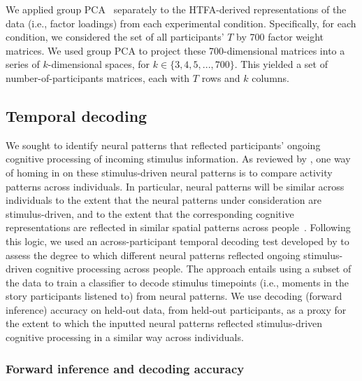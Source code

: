 \documentclass[english, 11pt]{article}
\begin{document}
We applied group PCA~\citep{SmitEtal14} separately to the HTFA-derived
representations of the data (i.e., factor loadings) from each experimental
condition. Specifically, for each condition, we considered the set of all
participants' $T$ by 700 factor weight matrices. We used group PCA to project
these 700-dimensional matrices into a series of $k$-dimensional spaces, for $k
\in \{3, 4, 5, ..., 700\}$. This yielded a set of number-of-participants
matrices, each with $T$ rows and $k$ columns.

\subsection*{Temporal decoding}

We sought to identify neural patterns that reflected participants' ongoing
cognitive processing of incoming stimulus information. As reviewed by
\cite{SimoEtal16}, one way of homing in on these stimulus-driven neural
patterns is to compare activity patterns across individuals. In particular,
neural patterns will be similar across individuals to the extent that the
neural patterns under consideration are stimulus-driven, and to the extent that
the corresponding cognitive representations are reflected in similar spatial
patterns across people~\cite{SimoChan20}. Following this logic, we used an
across-participant temporal decoding test developed by \cite{MannEtal18} to
assess the degree to which different neural patterns reflected ongoing
stimulus-driven cognitive processing across people. The approach entails using
a subset of the data to train a classifier to decode stimulus timepoints (i.e.,
moments in the story participants listened to) from neural patterns. We use
decoding (forward inference) accuracy on held-out data, from held-out
participants, as a proxy for the extent to which the inputted neural patterns
reflected stimulus-driven cognitive processing in a similar way across
individuals.

\subsubsection*{Forward inference and decoding accuracy}
\end{document}

